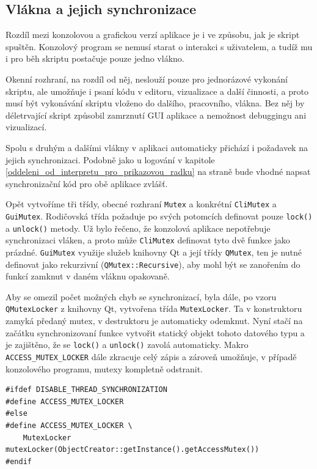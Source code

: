\documentclass[11pt,twoside,a4paper]{book}
\begin{document}
\subsection{Vlákna a jejich synchronizace}

Rozdíl mezi konzolovou a grafickou verzí aplikace je i ve způsobu, jak je skript spuštěn. Konzolový program se nemusí starat o interakci s uživatelem, a tudíž mu i pro běh skriptu postačuje pouze jedno vlákno.

Okenní rozhraní, na rozdíl od něj, neslouží pouze pro jednorázové vykonání skriptu, ale umožňuje i psaní kódu v editoru, vizualizace a další činnosti, a proto musí být vykonávání skriptu vloženo do dalšího, pracovního, vlákna. Bez něj by déletrvající skript způsobil zamrznutí GUI aplikace a nemožnost debuggingu ani vizualizací.

Spolu s druhým a dalšími vlákny v aplikaci automaticky přichází i požadavek na jejich synchronizaci. Podobně jako u logování v kapitole \ref{oddeleni_od_interpretu_pro_prikazovou_radku} na straně \pageref{oddeleni_od_interpretu_pro_prikazovou_radku} bude vhodné napsat synchronizační kód pro obě aplikace zvlášť.

Opět vytvoříme tři třídy, obecné rozhraní \texttt{Mutex} a konkrétní \texttt{CliMutex} a \texttt{GuiMutex}. Ro\-di\-čov\-ská třída požaduje po svých potomcích definovat pouze \texttt{lock()} a \texttt{unlock()} metody. Už bylo řečeno, že konzolová aplikace nepotřebuje synchronizaci vláken, a proto může \texttt{CliMutex} definovat tyto dvě funkce jako prázdné. \texttt{GuiMutex} využije služeb knihovny Qt a její třídy \texttt{QMutex}, ten je nutné definovat jako rekurzivní (\texttt{QMutex::Recursive}), aby mohl být se zanořením do funkcí zamknut v daném vláknu opakovaně.

Aby se omezil počet možných chyb se synchronizací, byla dále, po vzoru \texttt{QMu\-tex\-Loc\-ker} z knihovny Qt, vytvořena třída \texttt{MutexLocker}. Ta v konstruktoru zamyká předaný mutex, v destruktoru je automaticky odemknut. Nyní stačí na začátku synchronizovaní funkce vytvořit statický objekt tohoto datového typu a je zajištěno, že se \texttt{lock()} a \texttt{unlock()} zavolá automaticky. Makro \texttt{ACCESS\_MUTEX\_LOCKER} dále zkracuje celý zápis a zároveň umožňuje, v případě konzolového programu, mutexy kompletně odstranit.

\begin{verbatim}
#ifdef DISABLE_THREAD_SYNCHRONIZATION
#define ACCESS_MUTEX_LOCKER
#else
#define ACCESS_MUTEX_LOCKER \
    MutexLocker mutexLocker(ObjectCreator::getInstance().getAccessMutex())
#endif
\end{verbatim}
\end{document}
